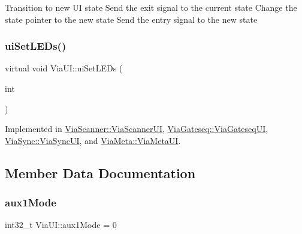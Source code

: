 Transition to new UI state Send the exit signal to the current state Change the state pointer to the new state Send the entry signal to the new state \mbox{\label{class_via_u_i_a4bd3d575f4efe1273d6e4645454ead52}} 
\subsubsection{\texorpdfstring{ui\+Set\+L\+E\+Ds()}{uiSetLEDs()}}
{\footnotesize\ttfamily virtual void Via\+U\+I\+::ui\+Set\+L\+E\+Ds (\begin{DoxyParamCaption}\item[{int}]{ }\end{DoxyParamCaption})\hspace{0.3cm}{\ttfamily [pure virtual]}}



Implemented in \mbox{\hyperlink{class_via_scanner_1_1_via_scanner_u_i_aa2c3ca7904d9036eb362c7600dac66b0}{Via\+Scanner\+::\+Via\+Scanner\+UI}}, \mbox{\hyperlink{class_via_gateseq_1_1_via_gateseq_u_i_ab3eb51f8dcb036861e62c4456d726771}{Via\+Gateseq\+::\+Via\+Gateseq\+UI}}, \mbox{\hyperlink{class_via_sync_1_1_via_sync_u_i_a694877fa6ee36aa11d9fbf3e249f95e5}{Via\+Sync\+::\+Via\+Sync\+UI}}, and \mbox{\hyperlink{class_via_meta_1_1_via_meta_u_i_a54f7dbc780758a9842836a9cdd3239a0}{Via\+Meta\+::\+Via\+Meta\+UI}}.



\subsection{Member Data Documentation}
\mbox{\label{class_via_u_i_aaab0b4a294ded73b9ac59d387a94b854}} 
\subsubsection{\texorpdfstring{aux1\+Mode}{aux1Mode}}
{\footnotesize\ttfamily int32\+\_\+t Via\+U\+I\+::aux1\+Mode = 0}

\mbox{\label{class_via_u_i_ae52e25594e34359538ee1de8d3710dfc}} 
